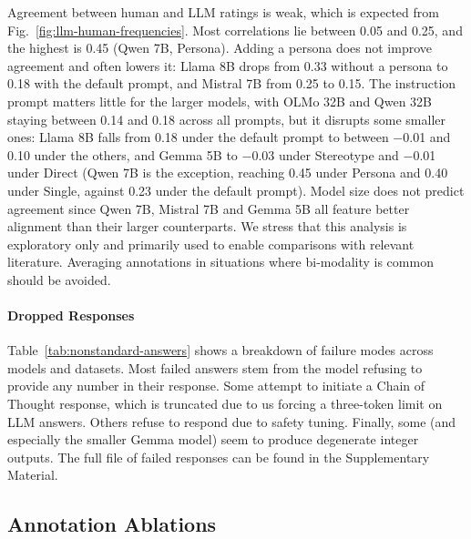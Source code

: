 \documentclass[manuscript,screen,review,anonymous]{acmart}
\theoremstyle{acmplain}
\theoremstyle{researchquestionstyle}
\begin{document}
Agreement between human and LLM ratings is weak, which is expected from Fig.~\ref{fig:llm-human-frequencies}. Most correlations lie between 0.05 and 0.25, and the highest is 0.45 (Qwen 7B, Persona). Adding a persona does not improve agreement and often lowers it: Llama 8B drops from 0.33 without a persona to 0.18 with the default prompt, and Mistral 7B from 0.25 to 0.15. The instruction prompt matters little for the larger models, with OLMo 32B and Qwen 32B staying between 0.14 and 0.18 across all prompts, but it disrupts some smaller ones: Llama 8B falls from 0.18 under the default prompt to between −0.01 and 0.10 under the others, and Gemma 5B to −0.03 under Stereotype and −0.01 under Direct (Qwen 7B is the exception, reaching 0.45 under Persona and 0.40 under Single, against 0.23 under the default prompt). Model size does not predict agreement since Qwen 7B, Mistral 7B and Gemma 5B all feature better alignment than their larger counterparts. We stress that this analysis is exploratory only and primarily used to enable comparisons with relevant literature. Averaging annotations in situations where bi-modality is common should be avoided.


\paragraph{Dropped Responses} Table~\ref{tab:nonstandard-answers} shows a breakdown of failure modes across models and datasets. Most failed answers stem from the model refusing to provide any number in their response. Some attempt to initiate a Chain of Thought response, which is truncated due to us forcing a three-token limit on LLM answers. Others refuse to respond due to safety tuning. Finally, some (and especially the smaller Gemma model) seem to produce degenerate integer outputs. The full file of failed responses can be found in the Supplementary Material.


\subsection{Annotation Ablations}

\begin{center}
	
	
	
	
	
	
	
	
	
	
	
\end{center}
\end{document}
